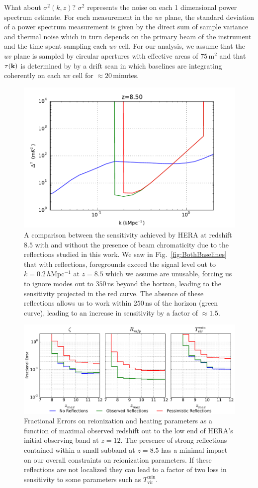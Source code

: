 \documentclass[twocolumn]{emulateapj}
\begin{document}
What about $\sigma^2(k,z)$? $\sigma^2$ represents the noise on each 1 dimensional power spectrum estimate. For each measurement in the $uv$ plane, the standard deviation of a power spectrum measurement is given by the direct sum of sample variance and thermal noise \citep{McQuinn:2006} which in turn depends on the primary beam of the instrument and the time spent sampling each $uv$ cell. For our analysis, we assume that the $uv$ plane is sampled by circular apertures with effective areas of $75$\,m$^2$ and that $\tau({\bf k})$ is determined by by a drift scan in which baselines are integrating coherently on each $uv$ cell for $\approx 20$\,minutes. 


\begin{figure}
\includegraphics[width=.5\textwidth]{figures/sensitivity_comparison_v2.pdf}
\caption{A comparison between the sensitivity achieved by HERA at redshift $8.5$ with and without the presence of beam chromaticity due to the reflections studied in this work. We saw in Fig.~\ref{fig:BothBaselines} that with reflections, foregrounds exceed the signal level out to $k=0.2$\,$h$Mpc$^{-1}$ at $z=8.5$ which we assume are unusable, forcing us to ignore modes out to $350$\,ns beyond the horizon, leading to the sensitivity projected in the red curve. The absence of these reflections allows us to work within $250$\,ns of the horizon (green curve), leading to an increase in sensitivity by a factor of $\approx 1.5$. }
\label{fig:Sensitivity}
\end{figure}



\begin{figure}[h!]
\includegraphics[width=\textwidth]{figures/sigmaVsZ_reionization_v2.pdf}
\caption{Fractional Errors on reionization and heating parameters as a function of maximal observed redshift out to the low end of HERA's initial observing band at $z=12$. The presence of strong reflections contained within a small subband at $z=8.5$ has a minimal impact on our overall constraints on reionization parameters. If these reflections are not localized they can lead to a factor of two loss in sensitivity to some parameters such as $T_\text{vir}^\text{min}$.}
\label{fig:Errors}
\end{figure}
\end{document}
